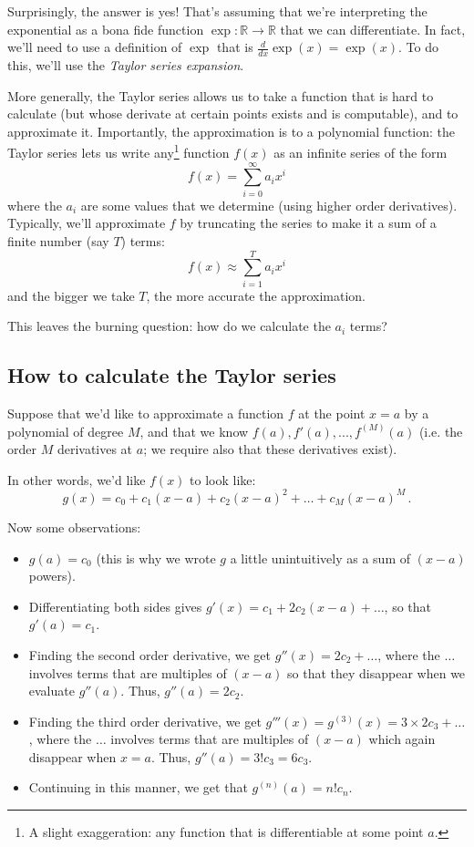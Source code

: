 \documentclass[12pt]{article}
\begin{document}
Surprisingly, the answer is yes! That's assuming that we're interpreting the exponential as a bona fide function $\exp:\mathbb{R}\to \mathbb{R}$ that we can differentiate. In fact, we'll need to use a definition of $\exp$ that is $\frac{d}{dx}\exp(x) = \exp(x)$. To do this, we'll use the \emph{Taylor series expansion}.

More generally, the Taylor series allows us to take a function that is hard to calculate (but whose derivate at certain points exists and is computable), and to approximate it. Importantly, the approximation is to a polynomial function: the Taylor series lets us write any\footnote{A slight exaggeration: any function that is differentiable at some point $a$.} function $f(x)$ as an infinite series of the form 
\[
f(x) = \sum_{i=0}^{\infty}a_i x^i 
\]
where the $a_i$ are some values that we determine (using higher order derivatives). Typically, we'll approximate $f$ by truncating the series to make it a sum of a finite number (say $T$) terms:
\[
f(x) \approx \sum_{i=1}^T a_i x^i
\]
and the bigger we take $T$, the more accurate the approximation. 

This leaves the burning question: how do we calculate the $a_i$ terms? 

\subsection*{How to calculate the Taylor series}
Suppose that we'd like to approximate a function $f$ at the point $x=a$ by a polynomial of degree $M$, and that we know $f(a), f'(a), ..., f^{(M)}(a)$ (i.e. the order $M$ derivatives at $a$; we require also that these derivatives exist).

In other words, we'd like $f(x)$ to look like:
\[
g(x) = c_0 + c_1(x-a) + c_2 (x-a)^2 + \dots + c_M(x-a)^M\,.
\]

Now some observations:
\begin{itemize}
\item  $g(a) = c_0$ (this is why we wrote $g$ a little unintuitively as a sum of $(x-a)$ powers). 
\item Differentiating both sides gives $g'(x) = c_1 + 2c_2(x-a)+\dots$, so that $g'(a) = c_1$. 
\item Finding the second order derivative, we get $g''(x) = 2c_2+\dots$, where the $\dots$ involves terms that are multiples of $(x-a)$ so that they disappear when we evaluate $g''(a)$. Thus, $g''(a) = 2c_2$.
\item Finding the third order derivative, we get $g'''(x) =g^{(3)}(x)= 3\times 2c_3+\dots$, where the $\dots$ involves terms that are multiples of $(x-a)$ which again disappear when $x=a$. Thus, $g''(a) = 3!c_3 = 6c_3$.
\item Continuing in this manner, we get that $g^{(n)}(a) = n!c_n$.
\end{itemize}
\end{document}
